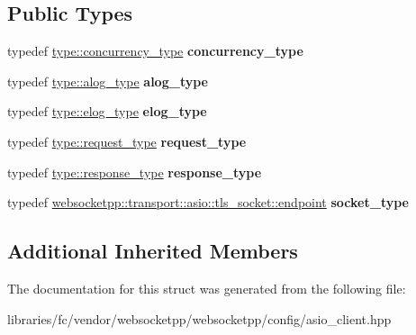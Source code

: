 \subsection*{Public Types}
\begin{DoxyCompactItemize}
\item 
\mbox{\label{structwebsocketpp_1_1config_1_1asio__tls__client_1_1transport__config_a004ad3230230efb93f874f811299d9cb}} 
typedef \mbox{\hyperlink{classwebsocketpp_1_1concurrency_1_1basic}{type\+::concurrency\+\_\+type}} {\bfseries concurrency\+\_\+type}
\item 
\mbox{\label{structwebsocketpp_1_1config_1_1asio__tls__client_1_1transport__config_a37d7fb266b524e1241062c6cc036a311}} 
typedef \mbox{\hyperlink{classwebsocketpp_1_1log_1_1basic}{type\+::alog\+\_\+type}} {\bfseries alog\+\_\+type}
\item 
\mbox{\label{structwebsocketpp_1_1config_1_1asio__tls__client_1_1transport__config_aeaf3b0238fc7a3945622b9a3782e380e}} 
typedef \mbox{\hyperlink{classwebsocketpp_1_1log_1_1basic}{type\+::elog\+\_\+type}} {\bfseries elog\+\_\+type}
\item 
\mbox{\label{structwebsocketpp_1_1config_1_1asio__tls__client_1_1transport__config_acec13ad946799858d62b0ca00c7a1c39}} 
typedef \mbox{\hyperlink{classwebsocketpp_1_1http_1_1parser_1_1request}{type\+::request\+\_\+type}} {\bfseries request\+\_\+type}
\item 
\mbox{\label{structwebsocketpp_1_1config_1_1asio__tls__client_1_1transport__config_a34d2cfd009eb65e18b24b265de0c785d}} 
typedef \mbox{\hyperlink{classwebsocketpp_1_1http_1_1parser_1_1response}{type\+::response\+\_\+type}} {\bfseries response\+\_\+type}
\item 
\mbox{\label{structwebsocketpp_1_1config_1_1asio__tls__client_1_1transport__config_a5d1ee7d647e7f3a9e5c0da24b27a9803}} 
typedef \mbox{\hyperlink{classwebsocketpp_1_1transport_1_1asio_1_1tls__socket_1_1endpoint}{websocketpp\+::transport\+::asio\+::tls\+\_\+socket\+::endpoint}} {\bfseries socket\+\_\+type}
\end{DoxyCompactItemize}
\subsection*{Additional Inherited Members}


The documentation for this struct was generated from the following file\+:\begin{DoxyCompactItemize}
\item 
libraries/fc/vendor/websocketpp/websocketpp/config/asio\+\_\+client.\+hpp\end{DoxyCompactItemize}
